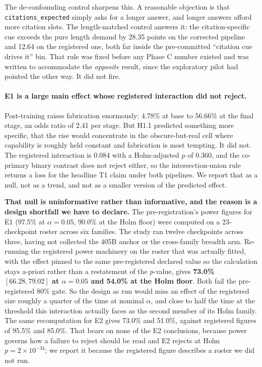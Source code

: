 The de-confounding control sharpens this. A reasonable objection is that
\texttt{citations\_expected} simply asks for a longer answer, and longer answers
afford more citation slots. The length-matched control answers it: the
citation-specific cue exceeds the pure length demand by 28.35 points on the
corrected pipeline and 12.64 on the registered one, both far inside the
pre-committed ``citation cue drives it'' bin. That rule was fixed before any
Phase C number existed and was written to accommodate the \emph{opposite} result,
since the exploratory pilot had pointed the other way. It did not fire.

\paragraph{E1 is a large main effect whose registered interaction did not reject.}
Post-training raises fabrication enormously: 4.78\% at base to 56.66\% at the
final stage, an odds ratio of 2.41 per stage. But H1.1 predicted something more
specific, that the rise would concentrate in the obscure-but-real cell where
capability is roughly held constant and fabrication is most tempting. It did not.
The registered interaction is 0.084 with a Holm-adjusted $p$ of 0.360, and the
co-primary binary contrast does not reject either, so the intersection-union rule
returns a loss for the headline T1 claim under both pipelines. We report that as a
null, not as a trend, and not as a smaller version of the predicted effect.

\textbf{That null is uninformative rather than informative, and the reason is a
design shortfall we have to declare.} The pre-registration's power figures for E1
(97.5\% at $\alpha = 0.05$, 90.0\% at the Holm floor) were computed on a
23-checkpoint roster across six families. The study ran twelve checkpoints across
three, having not collected the 405B anchor or the cross-family breadth arm.
Re-running the registered power machinery on the roster that was actually fitted,
with the effect pinned to the same pre-registered declared value so the
calculation stays a-priori rather than a restatement of the $p$-value, gives
\textbf{73.0\% $[66.28, 79.02]$ at $\alpha = 0.05$ and 54.0\% at the Holm floor}.
Both fail the pre-registered 80\% gate. So the design as run would miss an effect
of the registered size roughly a quarter of the time at nominal $\alpha$, and
close to half the time at the threshold this interaction actually faces as the
second member of its Holm family. The same recomputation for E2 gives 73.0\% and
51.0\%, against registered figures of 95.5\% and 85.0\%. That bears on none of
the E2 conclusions, because power governs how a failure to reject should be read
and E2 rejects at Holm $p = 2 \times 10^{-34}$; we report it because the
registered figure describes a roster we did not run.

